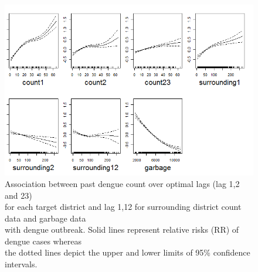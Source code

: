 \documentclass{bmcart}
\begin{document}
\begin{figure}[h!]
	\begin{center}
		\includegraphics[width= 0.97 \textwidth]{Fit-OptimalRepresentation+Garbage}
		\caption{Association between past dengue count over optimal lags (lag 1,2 and 23) \\ for each target district and lag 1,12 for surrounding district count data and garbage data \\ with dengue outbreak.  Solid lines represent relative risks (RR) of dengue cases whereas\\ the dotted lines depict the upper and lower limits of 95\% confidence intervals.}
		\label{figure-mostOptimalFit}
	\end{center}
\end{figure}
\end{document}
